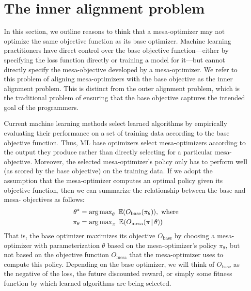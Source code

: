 \documentclass[
  onecolumn,
  natbib,
]{miri-tech-article}
\begin{document}
\section{The inner alignment problem}
\label{sec:3}

In this section, we outline reasons to think that a mesa-optimizer may not optimize the same objective function as its base optimizer. Machine learning practitioners have direct control over the base objective function---either by specifying the loss function directly or training a model for it---but cannot directly specify the mesa-objective developed by a mesa-optimizer. We refer to this problem of aligning mesa-optimizers with the base objective as the inner alignment problem. This is distinct from the outer alignment problem, which is the traditional problem of ensuring that the base objective captures the intended goal of the programmers.

Current machine learning methods select learned algorithms by empirically evaluating their performance on a set of training data according to the base objective function. Thus, ML base optimizers select mesa-optimizers according to the output they produce rather than directly selecting for a particular mesa-objective. Moreover, the selected mesa-optimizer's policy only has to perform well (as scored by the base objective) on the training data. If we adopt the assumption that the mesa-optimizer computes an optimal policy given its objective function, then we can summarize the relationship between the base and mesa- objectives as follows:\cite{chris}
\begin{align*}
  \theta^* &= \operatorname{arg\,max}_\theta~ \mathbb E(O_{\text{base}}(\pi_\theta)),~ \text{where} \\
  \pi_\theta &= \operatorname{arg\,max}_\pi~ \mathbb E(O_{\text{mesa}}(\pi \,|\, \theta))
\end{align*}
That is, the base optimizer maximizes its objective $O_\text{base}$ by choosing a mesa-optimizer with parameterization $\theta$ based on the mesa-optimizer's policy $\pi_\theta$, but not based on the objective function $O_\text{mesa}$ that the mesa-optimizer uses to compute this policy. Depending on the base optimizer, we will think of $O_\text{base}$ as the negative of the loss, the future discounted reward, or simply some fitness function by which learned algorithms are being selected.
\end{document}
